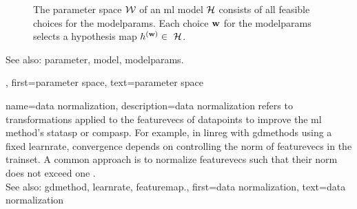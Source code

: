 {{\begin{figure}[H]
\begin{center}
			\end{center} 
			\caption{The \gls{parameter} space $\mathcal{W}$ of an \gls{ml} \gls{model} $\mathcal{H}$ consists of all 
			feasible choices for the \glspl{modelparam}. Each choice ${\bf w}$ for the \glspl{modelparam} 
			selects a \gls{hypothesis} \gls{map} $\hypothesis^{(\weights)} \in \hypospace$.
				 \label{fig_param_space_dict}} 
			\end{figure}
			See also: \gls{parameter}, \gls{model}, \glspl{modelparam}.},
		first={parameter space},
		text={parameter space}
}

{name={data normalization},
	description={\Gls{data} normalization refers to transformations 
		applied to the \glspl{featurevec} of \glspl{datapoint} to improve the \gls{ml} method's 
		\gls{statasp} or \gls{compasp}. For example, in \gls{linreg} with \glspl{gdmethod} using 
		a fixed \gls{learnrate}, \gls{convergence} depends on controlling the \gls{norm} of \glspl{featurevec} 
		in the \gls{trainset}. A common approach is to normalize \glspl{featurevec} such that their 
		\gls{norm} does not exceed one \cite[Ch.\ 5]{MLBasics}.
				\\
		See also:  \gls{gdmethod}, \gls{learnrate}, \gls{featuremap}.},
	first={data normalization},
	text={data normalization}
}

